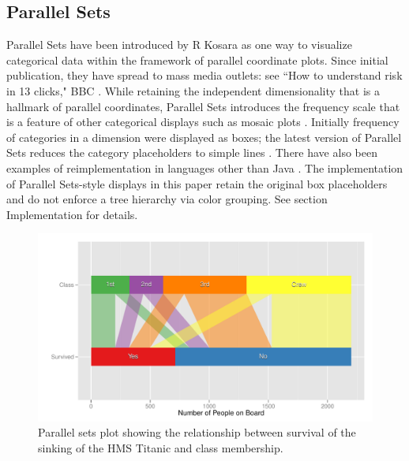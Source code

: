 \subsection{Parallel Sets}


Parallel Sets have been introduced by R Kosara \citep{kosara:2006} as one way to visualize categorical data within the framework of parallel coordinate plots. Since initial publication, they have spread to mass media outlets: see %
``How to understand risk in 13 clicks," BBC \citep{bbc:2009}.  While retaining the independent dimensionality that is a hallmark of parallel coordinates, Parallel Sets introduces the frequency scale that is a feature of other categorical displays such as mosaic plots \citep{kosara:2006}. Initially frequency of categories in a dimension were displayed as boxes; the latest version of Parallel Sets reduces the category placeholders to simple lines \citep{parsetredesign}. There have also been examples of reimplementation in languages other than Java \citep{davies}.  The implementation of Parallel Sets-style displays in this paper retain the original box placeholders and do not enforce a tree hierarchy via color grouping. See section Implementation for details.


\begin{figure}[hbtp]
\centering
\includegraphics[width=.9\linewidth]{images/parset-titanic}
\caption{\label{question1a} Parallel sets plot showing the relationship between survival of the sinking of the HMS Titanic and class membership. }
\end{figure}


